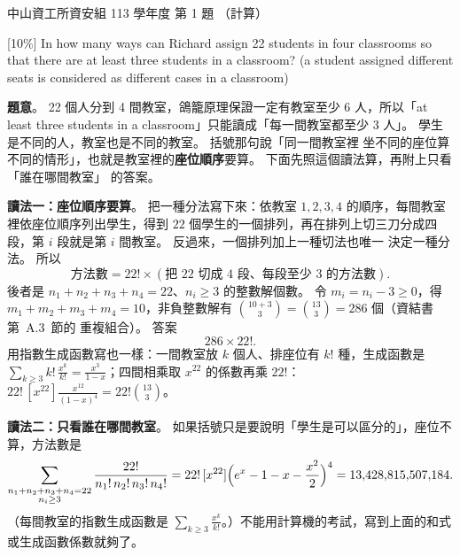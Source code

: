 \begin{pastexam}[label={px:nsysu-113-dmalg-01}]{中山資工所資安組 113 學年度 第 1 題}
（計算）

{[10\%]} In how many ways can Richard assign 22 students in four classrooms so that there are at least three
students in a classroom? (a student assigned different seats is considered as different cases in a
classroom)
\end{pastexam}

\begin{pastsoln}
\textbf{題意}。 22 個人分到 4 間教室，鴿籠原理保證一定有教室至少 $6$ 人，所以「at least three students in a
classroom」只能讀成「每一間教室都至少 $3$ 人」。 學生是不同的人，教室也是不同的教室。 括號那句說「同一間教室裡
坐不同的座位算不同的情形」，也就是教室裡的\textbf{座位順序}要算。 下面先照這個讀法算，再附上只看「誰在哪間教室」
的答案。

\textbf{讀法一：座位順序要算}。 把一種分法寫下來：依教室 $1, 2, 3, 4$ 的順序，每間教室裡依座位順序列出學生，得到
$22$ 個學生的一個排列，再在排列上切三刀分成四段，第 $i$ 段就是第 $i$ 間教室。 反過來，一個排列加上一種切法也唯一
決定一種分法。 所以
\[
\text{方法數} = 22! \times (\text{把 } 22 \text{ 切成 } 4 \text{ 段、每段至少 } 3 \text{ 的方法數}).
\]
後者是 $n_1 + n_2 + n_3 + n_4 = 22$、$n_i \ge 3$ 的整數解個數。 令 $m_i = n_i - 3 \ge 0$，得
$m_1 + m_2 + m_3 + m_4 = 10$，非負整數解有 $\binom{10 + 3}{3} = \binom{13}{3} = 286$ 個（資結書第~A.3~節的
重複組合）。 答案
\[
286 \times 22! .
\]
用指數生成函數寫也一樣：一間教室放 $k$ 個人、排座位有 $k!$ 種，生成函數是
$\sum_{k \ge 3} k!\, \frac{x^k}{k!} = \frac{x^3}{1 - x}$；四間相乘取 $x^{22}$ 的係數再乘 $22!$：
$22! \, [x^{22}] \frac{x^{12}}{(1-x)^4} = 22! \binom{13}{3}$。

\textbf{讀法二：只看誰在哪間教室}。 如果括號只是要說明「學生是可以區分的」，座位不算，方法數是
\[
\sum_{\substack{n_1 + n_2 + n_3 + n_4 = 22 \\ n_i \ge 3}} \frac{22!}{n_1!\, n_2!\, n_3!\, n_4!}
= 22! \, [x^{22}] \Bigl(e^x - 1 - x - \frac{x^2}{2}\Bigr)^4 = 13{,}428{,}815{,}507{,}184 .
\]
（每間教室的指數生成函數是 $\sum_{k \ge 3} \frac{x^k}{k!}$。）不能用計算機的考試，寫到上面的和式或生成函數係數就夠了。
\end{pastsoln}
